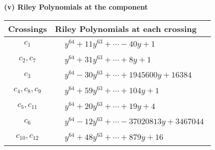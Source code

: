 \documentclass[1p]{elsarticle_modified}
\theoremstyle{definition}
\begin{document}
\flushleft \textbf{(v) Riley Polynomials at the component}\newline \\
\begin{tabular}{m{50pt}|m{274pt}}
Crossings & \hspace{64pt}Riley Polynomials at each crossing \\
\hline $$\begin{aligned}c_{1}\end{aligned}$$&$\begin{aligned}
&y^{64}+11 y^{63}+\cdots-40 y+1
\end{aligned}$\\
\hline $$\begin{aligned}c_{2},c_{7}\end{aligned}$$&$\begin{aligned}
&y^{64}+31 y^{63}+\cdots+8 y+1
\end{aligned}$\\
\hline $$\begin{aligned}c_{3}\end{aligned}$$&$\begin{aligned}
&y^{64}-30 y^{63}+\cdots+1945600 y+16384
\end{aligned}$\\
\hline $$\begin{aligned}c_{4},c_{8},c_{9}\end{aligned}$$&$\begin{aligned}
&y^{64}+59 y^{63}+\cdots+104 y+1
\end{aligned}$\\
\hline $$\begin{aligned}c_{5},c_{11}\end{aligned}$$&$\begin{aligned}
&y^{64}+20 y^{63}+\cdots+19 y+4
\end{aligned}$\\
\hline $$\begin{aligned}c_{6}\end{aligned}$$&$\begin{aligned}
&y^{64}-12 y^{63}+\cdots-37020813 y+3467044
\end{aligned}$\\
\hline $$\begin{aligned}c_{10},c_{12}\end{aligned}$$&$\begin{aligned}
&y^{64}+48 y^{63}+\cdots+879 y+16
\end{aligned}$\\
\hline
\end{tabular}\\~\\
\end{document}
